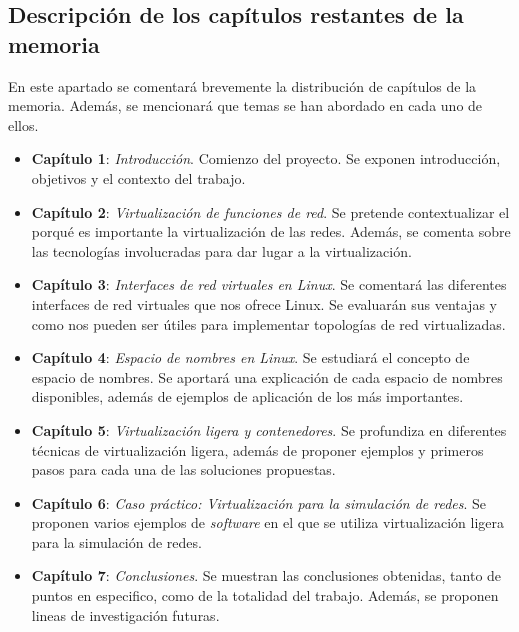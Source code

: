 \documentclass[12pt]{article}
\begin{document}
	\subsection{Descripción de los capítulos restantes de la memoria}
	\noindent En este apartado se comentará brevemente la distribución de capítulos de la memoria. Además, se mencionará que temas se han abordado en cada uno de ellos.
	\begin{itemize}
		\item \textbf{Capítulo 1}: \textit{Introducción}. Comienzo del proyecto. Se exponen introducción, objetivos y el contexto del trabajo. \\
		
		\item \textbf{Capítulo 2}: \textit{Virtualización de funciones de red}. Se pretende contextualizar el porqué es importante la virtualización de las redes. Además, se comenta sobre las tecnologías involucradas para dar lugar a la virtualización. \\
		
		\item \textbf{Capítulo 3}: \textit{Interfaces de red virtuales en Linux}. Se comentará las diferentes interfaces de red virtuales que nos ofrece Linux. Se evaluarán sus ventajas y como nos pueden ser útiles para implementar topologías de red virtualizadas. \\
		
		\item \textbf{Capítulo 4}: \textit{Espacio de nombres en Linux}. Se estudiará el concepto de espacio de nombres. Se aportará una explicación de cada espacio de nombres disponibles, además de ejemplos de aplicación de los más importantes. \\
		
		\item \textbf{Capítulo 5}: \textit{Virtualización ligera y contenedores}. Se profundiza en diferentes técnicas de virtualización ligera, además de proponer ejemplos y primeros pasos para cada una de las soluciones propuestas. \\
		
		\pagebreak
		
		\item \textbf{Capítulo 6}: \textit{Caso práctico: Virtualización para la simulación de redes}. Se proponen varios ejemplos de \textit{software} en el que se utiliza virtualización ligera para la simulación de redes. \\
		
		\item \textbf{Capítulo 7}: \textit{Conclusiones}. Se muestran las conclusiones obtenidas, tanto de puntos en especifico, como de la totalidad del trabajo. Además, se proponen lineas de investigación futuras. \\
	\end{itemize}
	
\end{document}

